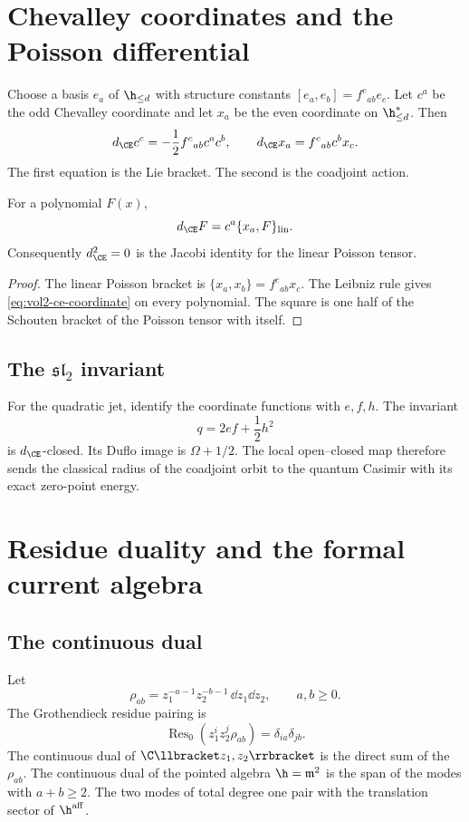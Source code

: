 \chapter{Chevalley coordinates and the Poisson differential}
Choose a basis $e_a$ of $\h_{\le d}$ with structure constants $[e_a,e_b]=f^c{}_{ab}e_c$.  Let $c^a$ be the odd Chevalley coordinate and let $x_a$ be the even coordinate on $\h_{\le d}^*$.  Then
\begin{equation}\label{eq:vol2-ce-coordinate}
 d_{\CE}c^c=-\frac12f^c{}_{ab}c^ac^b,
 \qquad
 d_{\CE}x_a=f^c{}_{ab}c^b x_c.
\end{equation}
The first equation is the Lie bracket.  The second is the coadjoint action.

\begin{proposition}
For a polynomial $F(x)$,
\[
 d_{\CE}F
 =c^a\{x_a,F\}_{\mathrm{lin}}.
\]
Consequently $d_{\CE}^2=0$ is the Jacobi identity for the linear Poisson tensor.
\end{proposition}
\begin{proof}
The linear Poisson bracket is $\{x_a,x_b\}=f^c{}_{ab}x_c$.  The Leibniz rule gives \eqref{eq:vol2-ce-coordinate} on every polynomial.  The square is one half of the Schouten bracket of the Poisson tensor with itself.
\end{proof}

\section{The \texorpdfstring{$\mathfrak{sl}_2$}{sl2} invariant}
For the quadratic jet, identify the coordinate functions with $e,f,h$.  The invariant
\[
 q=2ef+\frac12h^2
\]
is $d_{\CE}$-closed.  Its Duflo image is $\Omega+1/2$.  The local open--closed map therefore sends the classical radius of the coadjoint orbit to the quantum Casimir with its exact zero-point energy.

\chapter{Residue duality and the formal current algebra}
\section{The continuous dual}
Let
\[
 \rho_{ab}=z_1^{-a-1}z_2^{-b-1}\,\dd z_1\dd z_2,
 \qquad a,b\ge0.
\]
The Grothendieck residue pairing is
\[
 \operatorname{Res}_0\left(z_1^iz_2^j\rho_{ab}\right)
 =\delta_{ia}\delta_{jb}.
\]
The continuous dual of $\C\llbracket z_1,z_2\rrbracket$ is the direct sum of the $\rho_{ab}$.  The continuous dual of the pointed algebra $\h=\mathfrak m^2$ is the span of the modes with $a+b\ge2$.  The two modes of total degree one pair with the translation sector of $\h^{\mathrm{aff}}$.

